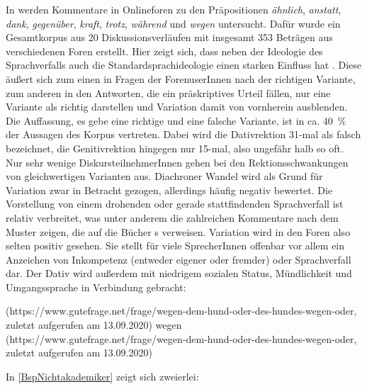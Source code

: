 In \citet[]{Vieregge.2015} werden Kommentare in Onlineforen zu den Präpositionen \textit{ähnlich}, \textit{anstatt}, \textit{dank}, \textit{gegenüber}, \textit{kraft}, \textit{trotz}, \textit{während} und \textit{wegen} untersucht. 
Dafür wurde ein Gesamtkorpus aus 20 Diskussionsverläufen mit insgesamt 353 Beträgen aus verschiedenen Foren erstellt. 
Hier zeigt sich, dass neben der Ideologie des Sprachverfalls auch die Standardsprachideologie einen starken Einfluss hat \citep[s.][]{Vieregge.2015}. 
Diese äußert sich zum einen in Fragen der ForenuserInnen nach der richtigen Variante, zum anderen in den Antworten, die ein präskriptives Urteil fällen, nur eine Variante als richtig darstellen und Variation damit von vornherein ausblenden. 
Die Auffassung, es gebe eine richtige und eine falsche Variante, ist in ca. 40~\% der Aussagen des Korpus vertreten.
Dabei wird die Dativrektion 31-mal als falsch bezeichnet, die Genitivrektion hingegen nur 15-mal, also ungefähr halb so oft. 
Nur sehr wenige DiskursteilnehmerInnen gehen bei den Rektionsschwankungen von gleichwertigen Varianten aus.
Diachroner Wandel wird als Grund für Variation zwar in Betracht gezogen, allerdings häufig negativ bewertet. 
Die Vorstellung von einem drohenden oder gerade stattfindenden Sprachverfall ist relativ verbreitet, was unter anderem die zahlreichen Kommentare nach dem Muster  zeigen, die auf die Bücher \citeauthor{Sick2006}s verweisen.
Variation wird in den Foren also selten positiv gesehen. 
Sie stellt für viele SprecherInnen offenbar vor allem ein Anzeichen von Inkompetenz (entweder eigener oder fremder) oder Sprachverfall dar. 
Der Dativ wird außerdem mit niedrigem sozialen Status, Mündlichkeit und Umgangssprache in Verbindung gebracht: 
\begin{exe}
\ex {} (https://www.gutefrage.net/frage/wegen-dem-hund-oder-des-hundes-wegen-oder, zuletzt aufgerufen am 13.09.2020)
\label{BspNichtakademiker}
\ex {} wegen  (https://www.gutefrage.net/frage/wegen-dem-hund-oder-des-hundes-wegen-oder, zuletzt aufgerufen am 13.09.2020) 
\label{BspGrammatikbuch50er}
\end{exe}
In \autoref{BspNichtakademiker} zeigt sich zweierlei: 
